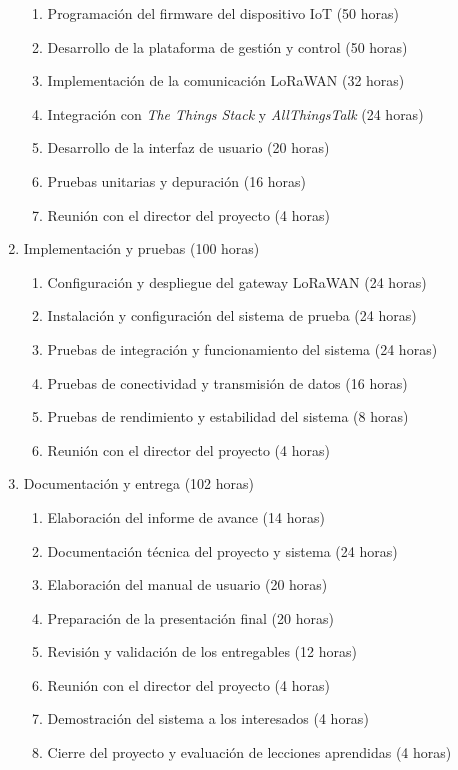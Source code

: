 \documentclass[
11pt, %
]{charter}
\begin{document}
\begin{enumerate}
\begin{enumerate}
	\item Programación del firmware del dispositivo IoT (50 horas)
	\item Desarrollo de la plataforma de gestión y control (50 horas)
	\item Implementación de la comunicación LoRaWAN (32 horas)
	\item Integración con \emph{The Things Stack} y \emph{AllThingsTalk} (24 horas)
	\item Desarrollo de la interfaz de usuario (20 horas)
	\item Pruebas unitarias y depuración (16 horas)
	\item Reunión con el director del proyecto (4 horas)
	\end{enumerate}
\item Implementación y pruebas (100 horas)
	\begin{enumerate}
	\item Configuración y despliegue del gateway LoRaWAN (24 horas)
	\item Instalación y configuración del sistema de prueba (24 horas)
	\item Pruebas de integración y funcionamiento del sistema (24 horas)
	\item Pruebas de conectividad y transmisión de datos (16 horas)
	\item Pruebas de rendimiento y estabilidad del sistema (8 horas)
	\item Reunión con el director del proyecto (4 horas)
	\end{enumerate}
\item Documentación y entrega (102 horas)
	\begin{enumerate}
	\item Elaboración del informe de avance (14 horas)
	\item Documentación técnica del proyecto y sistema (24 horas)
	\item Elaboración del manual de usuario (20 horas)
	\item Preparación de la presentación final (20 horas)
	\item Revisión y validación de los entregables (12 horas)
	\item Reunión con el director del proyecto (4 horas)
	\item Demostración del sistema a los interesados (4 horas)
	\item Cierre del proyecto y evaluación de lecciones aprendidas (4 horas)
	\end{enumerate}
\end{enumerate}
\end{document}
